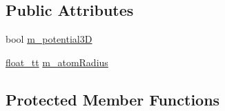 \subsection*{Public Attributes}
\begin{DoxyCompactItemize}
\item 
bool \hyperlink{class_q_s_t_e_m_1_1_c_potential_ac0c18b56f08fb41accc58ceedd53db1b}{m\-\_\-potential3\-D}
\item 
\hyperlink{namespace_q_s_t_e_m_a915d7caa497280d9f927c4ce8d330e47}{float\-\_\-tt} \hyperlink{class_q_s_t_e_m_1_1_c_potential_af11a143b59973336fee04b7c0b488699}{m\-\_\-atom\-Radius}
\end{DoxyCompactItemize}
\subsection*{Protected Member Functions}
